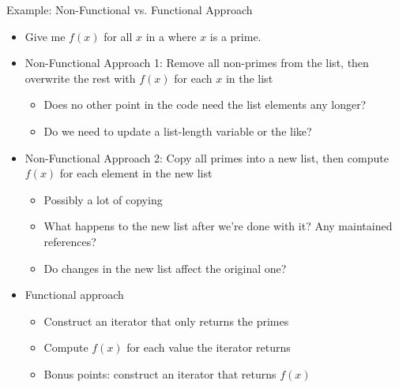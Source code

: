\begin{frame}{Example: Non-Functional vs. Functional Approach}
%
\begin{itemize}
\item Give me $f(x)$ for all $x$ in a  where $x$ is a prime.
\item Non-Functional Approach 1: Remove all non-primes from the list, then overwrite the rest with $f(x)$ for each $x$ in the list
	\begin{itemize}
	\item Does no other point in the code need the list elements any longer?
	\item Do we need to update a list-length variable or the like?
	\end{itemize}
\item Non-Functional Approach 2: Copy all primes into a new list, then compute $f(x)$ for each element in the new list
	\begin{itemize}
	\item Possibly a lot of copying
	\item What happens to the new list after we're done with it? Any maintained references?
	\item Do changes in the new list affect the original one?
	\end{itemize}
\item Functional approach
	\begin{itemize}
	\item Construct an iterator that only returns the primes
	\item Compute $f(x)$ for each value the iterator returns
	\item Bonus points: construct an iterator that returns $f(x)$
	\end{itemize}
\end{itemize}
%
\end{frame}



